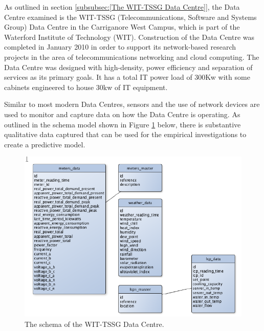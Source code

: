 \documentclass[12pt]{scrartcl}
\begin{document}
\label{subsec:[Data Available]}

As outlined in section \ref{subsubsec:[The WIT-TSSG Data Centre]}, the Data Centre examined is the WIT-TSSG (Telecommunications, Software and Systems Group) Data Centre in the Carriganore West Campus, which is part of the Waterford Institute of Technology (WIT). Construction of the Data Centre was completed in January 2010 in order to support its network-based research projects in the area of telecommunications networking and cloud computing. The Data Centre was designed with high-density, power efficiency and separation of services as its primary goals. It has a total IT power load of 300Kw with some cabinets engineered to house 30kw of IT equipment.

 

Similar to most modern Data Centres, sensors and the use of network devices are used to monitor and capture data on how the Data Centre is operating. As outlined in the schema model shown in Figure \ref{fig:TSSGdataschema} below, there is substantive qualitative data captured that can be used for the empirical investigations to create a predictive model. 

 

\begin{figure}[H]

  \caption{The schema of the WIT-TSSG Data Centre.}

  \label{fig:TSSGdataschema}

  \centering

    \includegraphics[scale=0.55]{TSSG_Data_Schema}

\end{figure}
\end{document}

